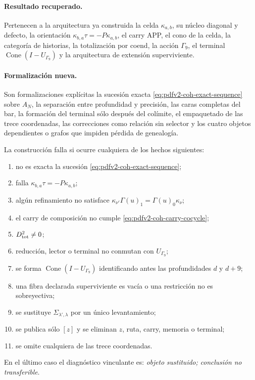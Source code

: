 \paragraph{Resultado recuperado.}
Pertenecen a la arquitectura ya construida la celda \(\kappa_{a,b}\), su
núcleo diagonal y defecto, la orientación
\(\kappa_{b,a}\tau=-P\kappa_{a,b}\), el carry APP, el cono de la celda, la
categoría de historias, la totalización por coend, la acción \(\Gamma_9\), el
terminal \(\operatorname{Cone}(I-U_{\Gamma_9})\) y la arquitectura de
extensión superviviente.

\paragraph{Formalización nueva.}
Son formalizaciones explícitas la sucesión exacta
\eqref{eq:pdfv2-coh-exact-sequence} sobre \(A_N\), la separación entre
profundidad y precisión, las caras completas del bar, la formación del
terminal sólo después del colímite, el empaquetado de las trece coordenadas,
las correcciones como relación sin selector y los cuatro objetos dependientes
o grafos que impiden pérdida de genealogía.

\begin{criterion}
\label{crit:pdfv2-coh-falsifiers}
La construcción falla si ocurre cualquiera de los hechos siguientes:
\begin{enumerate}
 \item no es exacta la sucesión
       \eqref{eq:pdfv2-coh-exact-sequence};
 \item falla \(\kappa_{b,a}\tau=-P\kappa_{a,b}\);
 \item algún refinamiento no satisface
       \(\kappa_{\nu'}\Gamma(u)_1=\Gamma(u)_0\kappa_\nu\);
 \item el carry de composición no cumple
       \eqref{eq:pdfv2-coh-carry-cocycle};
 \item \(D_{\rm tot}^2\neq0\);
 \item reducción, lector o terminal no conmutan con \(U_{\Gamma_9}\);
 \item se forma \(\operatorname{Cone}(I-U_{\Gamma_9})\) identificando antes
       las profundidades \(d\) y \(d+9\);
 \item una fibra declarada superviviente es vacía o una restricción no es
       sobreyectiva;
 \item se sustituye \(\Sigma_{\lambda',\lambda}\) por un único
       levantamiento;
 \item se publica sólo \([z]\) y se eliminan \(z\), ruta, carry, memoria o
       terminal;
 \item se omite cualquiera de las trece coordenadas.
\end{enumerate}
En el último caso el diagnóstico vinculante es: \emph{objeto sustituido;
conclusión no transferible}.
\end{criterion}


